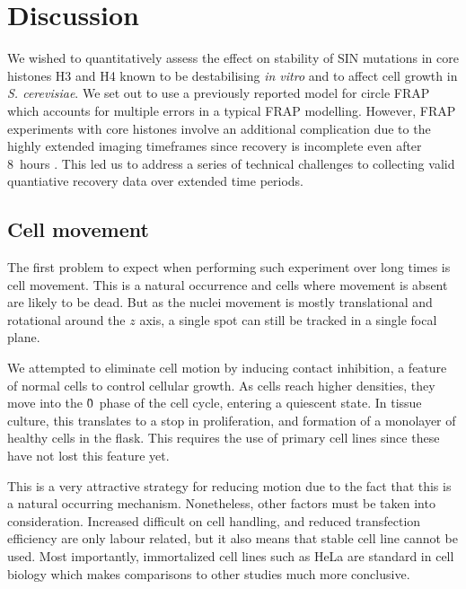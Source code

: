 \section{Discussion}

    We wished to quantitatively assess the effect on stability of SIN mutations in 
    core histones H3 and H4 known to be destabilising \textit{in vitro} and 
    to affect cell growth in \textit{S. cerevisiae}.
    We set out to use a previously reported model for circle FRAP 
    which accounts for multiple errors in a typical FRAP modelling.
    However, FRAP experiments with core histones involve
    an additional complication due to the highly extended imaging timeframes
    since recovery is incomplete even after 8~hours \citep{KimuraCook}.
    This led us to address a series of technical challenges to 
    collecting valid quantiative recovery data over extended time periods.

  \subsection{Cell movement}

    The first problem to expect when performing such experiment over
    long times is cell movement. This is a natural occurrence and cells
    where movement is absent are likely to be dead. But as the nuclei
    movement is mostly translational and rotational around the $z$ axis,
    a single spot can still be tracked in a single focal plane.

    \label{sec:kill-frap:discuss-contact-inhibition}

    We attempted to eliminate cell motion by inducing contact inhibition,
    a feature of normal cells to control cellular growth. As cells reach
    higher densities, they move into the \G0{}~phase of the cell cycle,
    entering a quiescent state. In tissue culture,
    this translates to a stop in proliferation, and formation of a monolayer
    of healthy cells in the flask. This requires the use of primary
    cell lines since these have not lost this feature yet.

    This is a very attractive strategy for reducing motion due to the
    fact that this is a natural occurring mechanism. Nonetheless,
    other factors must be taken into consideration.
    Increased difficult on cell handling, and reduced
    transfection efficiency are only labour related, but it also means
    that stable cell line cannot be used. Most importantly, immortalized
    cell lines such as HeLa are standard in cell biology which makes
    comparisons to other studies much more conclusive.

